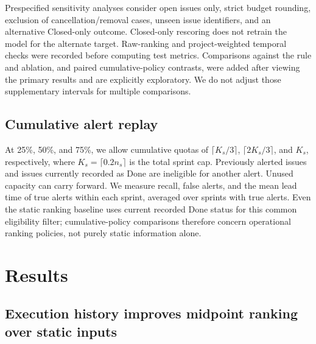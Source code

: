 \documentclass[11pt,a4paper]{article}
\begin{document}
Prespecified sensitivity analyses consider open issues only, strict budget rounding, exclusion of cancellation/removal cases, unseen issue identifiers, and an alternative Closed-only outcome. Closed-only rescoring does not retrain the model for the alternate target. Raw-ranking and project-weighted temporal checks were recorded before computing test metrics. Comparisons against the rule and ablation, and paired cumulative-policy contrasts, were added after viewing the primary results and are explicitly exploratory. We do not adjust those supplementary intervals for multiple comparisons.

\subsection{Cumulative alert replay}\label{cumulative-alert-replay}

At 25\%, 50\%, and 75\%, we allow cumulative quotas of \(\lceil K_s/3\rceil\), \(\lceil2K_s/3\rceil\), and \(K_s\), respectively, where \(K_s=\lceil0.2n_s\rceil\) is the total sprint cap. Previously alerted issues and issues currently recorded as Done are ineligible for another alert. Unused capacity can carry forward. We measure recall, false alerts, and the mean lead time of true alerts within each sprint, averaged over sprints with true alerts. Even the static ranking baseline uses current recorded Done status for this common eligibility filter; cumulative-policy comparisons therefore concern operational ranking policies, not purely static information alone.

\section{Results}\label{results}

\subsection{Execution history improves midpoint ranking over static inputs}\label{execution-history-improves-midpoint-ranking-over-static-inputs}
\end{document}
